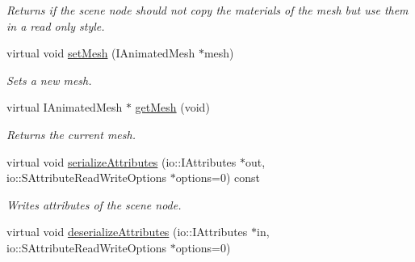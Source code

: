\begin{DoxyCompactItemize}
\begin{DoxyCompactList}\small\item\em Returns if the scene node should not copy the materials of the mesh but use them in a read only style. \end{DoxyCompactList}\item 
\hypertarget{classirr_1_1scene_1_1_c_animated_mesh_scene_node_aa809b5cf0ad694da32685d1289f99390}{virtual void \hyperlink{classirr_1_1scene_1_1_c_animated_mesh_scene_node_aa809b5cf0ad694da32685d1289f99390}{set\-Mesh} (I\-Animated\-Mesh $\ast$mesh)}\label{classirr_1_1scene_1_1_c_animated_mesh_scene_node_aa809b5cf0ad694da32685d1289f99390}

\begin{DoxyCompactList}\small\item\em Sets a new mesh. \end{DoxyCompactList}\item 
\hypertarget{classirr_1_1scene_1_1_c_animated_mesh_scene_node_abad88a1ad622e186208f1f48291ad25a}{virtual I\-Animated\-Mesh $\ast$ \hyperlink{classirr_1_1scene_1_1_c_animated_mesh_scene_node_abad88a1ad622e186208f1f48291ad25a}{get\-Mesh} (void)}\label{classirr_1_1scene_1_1_c_animated_mesh_scene_node_abad88a1ad622e186208f1f48291ad25a}

\begin{DoxyCompactList}\small\item\em Returns the current mesh. \end{DoxyCompactList}\item 
\hypertarget{classirr_1_1scene_1_1_c_animated_mesh_scene_node_ada04028e7be6c0386e352abb0df81174}{virtual void \hyperlink{classirr_1_1scene_1_1_c_animated_mesh_scene_node_ada04028e7be6c0386e352abb0df81174}{serialize\-Attributes} (io\-::\-I\-Attributes $\ast$out, io\-::\-S\-Attribute\-Read\-Write\-Options $\ast$options=0) const }\label{classirr_1_1scene_1_1_c_animated_mesh_scene_node_ada04028e7be6c0386e352abb0df81174}

\begin{DoxyCompactList}\small\item\em Writes attributes of the scene node. \end{DoxyCompactList}\item 
\hypertarget{classirr_1_1scene_1_1_c_animated_mesh_scene_node_a00a8c7ade15c4e4760e34eefaa22bf1e}{virtual void \hyperlink{classirr_1_1scene_1_1_c_animated_mesh_scene_node_a00a8c7ade15c4e4760e34eefaa22bf1e}{deserialize\-Attributes} (io\-::\-I\-Attributes $\ast$in, io\-::\-S\-Attribute\-Read\-Write\-Options $\ast$options=0)}\label{classirr_1_1scene_1_1_c_animated_mesh_scene_node_a00a8c7ade15c4e4760e34eefaa22bf1e}


\end{DoxyCompactItemize}
